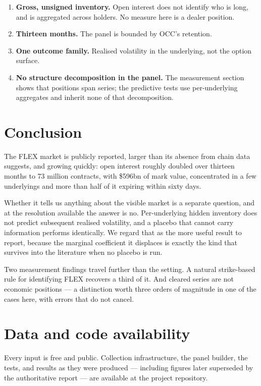 \documentclass[11pt]{article}
\begin{document}
\begin{enumerate}
\item \textbf{Gross, unsigned inventory.} Open interest does not identify who is long,
and is aggregated across holders. No measure here is a dealer position.
\item \textbf{Thirteen months.} The panel is bounded by OCC's retention.
\item \textbf{One outcome family.} Realised volatility in the underlying, not the option
surface.
\item \textbf{No structure decomposition in the panel.} The measurement section shows
that positions span series; the predictive tests use per-underlying aggregates and
inherit none of that decomposition.
\end{enumerate}

\section{Conclusion}

The FLEX market is publicly reported, larger than its absence from chain data suggests,
and growing quickly: open interest roughly doubled over thirteen months to 73 million
contracts, with \$596bn of mark value, concentrated in a few underlyings and more than
half of it expiring within sixty days.

Whether it tells us anything about the visible market is a separate question, and at
the resolution available the answer is no. Per-underlying hidden inventory does not
predict subsequent realised volatility, and a placebo that cannot carry information
performs identically. We regard that as the more useful result to report, because the
marginal coefficient it displaces is exactly the kind that survives into the literature
when no placebo is run.

Two measurement findings travel further than the setting. A natural strike-based rule
for identifying FLEX recovers a third of it. And cleared series are not economic
positions --- a distinction worth three orders of magnitude in one of the cases here,
with errors that do not cancel.

\section*{Data and code availability}

Every input is free and public. Collection infrastructure, the panel builder, the
tests, and results as they were produced --- including figures later superseded by the
authoritative report --- are available at the project repository.
\end{document}
